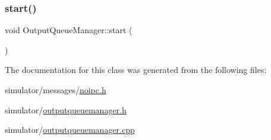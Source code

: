 \mbox{\label{class_output_queue_manager_a750683e13f885589c99763eb93a8488f}} 
\subsubsection{\texorpdfstring{start()}{start()}}
{\footnotesize\ttfamily void Output\+Queue\+Manager\+::start (\begin{DoxyParamCaption}{ }\end{DoxyParamCaption})}



The documentation for this class was generated from the following files\+:\begin{DoxyCompactItemize}
\item 
simulator/messages/\mbox{\hyperlink{noipc_8h}{noipc.\+h}}\item 
simulator/\mbox{\hyperlink{outputqueuemanager_8h}{outputqueuemanager.\+h}}\item 
simulator/\mbox{\hyperlink{outputqueuemanager_8cpp}{outputqueuemanager.\+cpp}}\end{DoxyCompactItemize}
